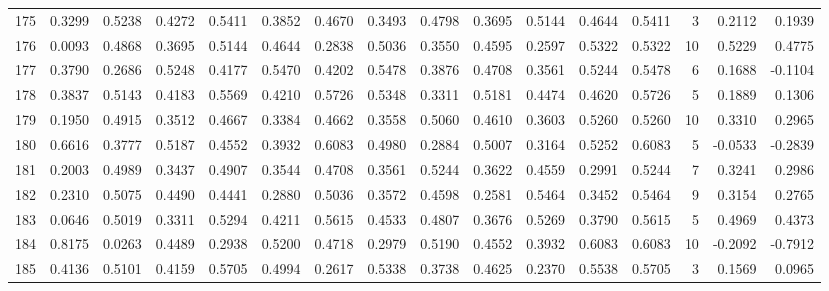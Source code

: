 \begin{tabular}{lrrrrrrrrrrrrrrr}
175 &      0.3299 &  0.5238 &  0.4272 &  0.5411 &  0.3852 &  0.4670 &  0.3493 &  0.4798 &  0.3695 &  0.5144 &   0.4644 &     0.5411 &      3 &                    0.2112 &                     0.1939 \\
176 &      0.0093 &  0.4868 &  0.3695 &  0.5144 &  0.4644 &  0.2838 &  0.5036 &  0.3550 &  0.4595 &  0.2597 &   0.5322 &     0.5322 &     10 &                    0.5229 &                     0.4775 \\
177 &      0.3790 &  0.2686 &  0.5248 &  0.4177 &  0.5470 &  0.4202 &  0.5478 &  0.3876 &  0.4708 &  0.3561 &   0.5244 &     0.5478 &      6 &                    0.1688 &                    -0.1104 \\
178 &      0.3837 &  0.5143 &  0.4183 &  0.5569 &  0.4210 &  0.5726 &  0.5348 &  0.3311 &  0.5181 &  0.4474 &   0.4620 &     0.5726 &      5 &                    0.1889 &                     0.1306 \\
179 &      0.1950 &  0.4915 &  0.3512 &  0.4667 &  0.3384 &  0.4662 &  0.3558 &  0.5060 &  0.4610 &  0.3603 &   0.5260 &     0.5260 &     10 &                    0.3310 &                     0.2965 \\
180 &      0.6616 &  0.3777 &  0.5187 &  0.4552 &  0.3932 &  0.6083 &  0.4980 &  0.2884 &  0.5007 &  0.3164 &   0.5252 &     0.6083 &      5 &                   -0.0533 &                    -0.2839 \\
181 &      0.2003 &  0.4989 &  0.3437 &  0.4907 &  0.3544 &  0.4708 &  0.3561 &  0.5244 &  0.3622 &  0.4559 &   0.2991 &     0.5244 &      7 &                    0.3241 &                     0.2986 \\
182 &      0.2310 &  0.5075 &  0.4490 &  0.4441 &  0.2880 &  0.5036 &  0.3572 &  0.4598 &  0.2581 &  0.5464 &   0.3452 &     0.5464 &      9 &                    0.3154 &                     0.2765 \\
183 &      0.0646 &  0.5019 &  0.3311 &  0.5294 &  0.4211 &  0.5615 &  0.4533 &  0.4807 &  0.3676 &  0.5269 &   0.3790 &     0.5615 &      5 &                    0.4969 &                     0.4373 \\
184 &      0.8175 &  0.0263 &  0.4489 &  0.2938 &  0.5200 &  0.4718 &  0.2979 &  0.5190 &  0.4552 &  0.3932 &   0.6083 &     0.6083 &     10 &                   -0.2092 &                    -0.7912 \\
185 &      0.4136 &  0.5101 &  0.4159 &  0.5705 &  0.4994 &  0.2617 &  0.5338 &  0.3738 &  0.4625 &  0.2370 &   0.5538 &     0.5705 &      3 &                    0.1569 &                     0.0965 \\

\end{tabular}
